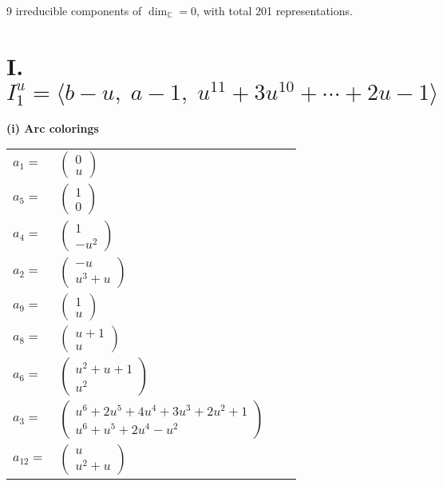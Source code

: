 \documentclass[1p]{elsarticle_modified}
\theoremstyle{definition}
\begin{document}
\raggedright * 9 irreducible components of $\dim_{\mathbb{C}}=0$, with total 201 representations.\\
\newpage
\renewcommand{\arraystretch}{1}
\centering \section*{I. $I^u_{1}= \langle b- u,\;a-1,\;u^{11}+3 u^{10}+\cdots+2 u-1 \rangle$}
\flushleft \textbf{(i) Arc colorings}\\
\begin{tabular}{m{7pt} m{180pt} m{7pt} m{180pt} }
\flushright $a_{1}=$&$\begin{pmatrix}0\\u\end{pmatrix}$ \\
\flushright $a_{5}=$&$\begin{pmatrix}1\\0\end{pmatrix}$ \\
\flushright $a_{4}=$&$\begin{pmatrix}1\\- u^2\end{pmatrix}$ \\
\flushright $a_{2}=$&$\begin{pmatrix}- u\\u^3+u\end{pmatrix}$ \\
\flushright $a_{9}=$&$\begin{pmatrix}1\\u\end{pmatrix}$ \\
\flushright $a_{8}=$&$\begin{pmatrix}u+1\\u\end{pmatrix}$ \\
\flushright $a_{6}=$&$\begin{pmatrix}u^2+u+1\\u^2\end{pmatrix}$ \\
\flushright $a_{3}=$&$\begin{pmatrix}u^6+2 u^5+4 u^4+3 u^3+2 u^2+1\\u^6+u^5+2 u^4- u^2\end{pmatrix}$ \\
\flushright $a_{12}=$&$\begin{pmatrix}u\\u^2+u\end{pmatrix}$ \\

\end{tabular}
\end{document}
